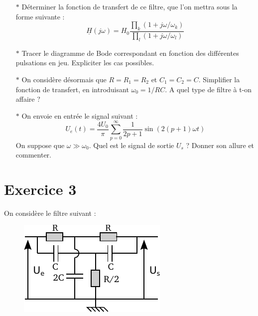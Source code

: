 \documentclass{report}
\begin{document}
\begin{itemize}

	\item[$\ast$] Déterminer la fonction de transfert de ce filtre, que l'on mettra sous la forme suivante : 
\begin{equation}
\underline{H}(j\omega) = H_{0}\frac{\prod_{k} (1+j\omega/\omega_{k})}{\prod_{l} (1+j\omega/\omega_{l})}
\end{equation} 

\item[$\ast$] Tracer le diagramme de Bode correspondant en fonction des différentes pulsations en jeu. Expliciter les cas possibles.

\item[$\ast$] On considère désormais que $R=R_1=R_2$ et $C_1=C_2=C$. Simplifier la fonction de transfert, en introduisant $\omega_0=1/RC$. A quel type de filtre à t-on affaire ?

\item[$\ast$] On envoie en entrée le signal suivant :
\begin{equation}
	U_e(t) = \frac{4U_0}{\pi}\sum_{p=0}^{\infty}\frac{1}{2p+1}\sin(2(p+1)\omega t)
\end{equation}
On suppose que $\omega\gg\omega_0$. Quel est le signal de sortie $U_s$ ? Donner son allure et commenter. 

\end{itemize}

 \newpage

\section*{Exercice 3}

On considère le filtre suivant :

\begin{figure}[!h]
\centering
\includegraphics[width=0.5\linewidth]{circuit_2.pdf}
\end{figure}
\end{document}
